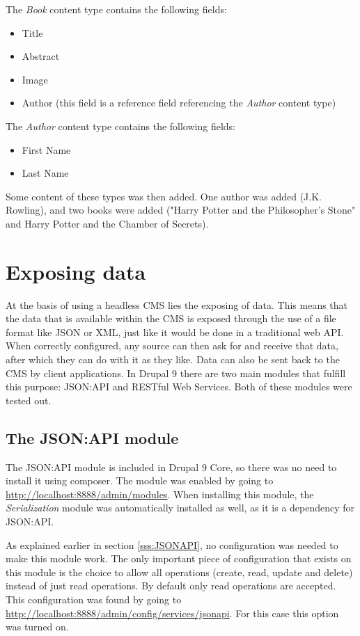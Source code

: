 The \emph{Book} content type contains the following fields: 

\begin{itemize}
	\item Title
	\item Abstract
	\item Image
	\item Author (this field is a reference field referencing the \emph{Author} content type)
\end{itemize}

The \emph{Author} content type contains the following fields:

\begin{itemize}
	\item First Name
	\item Last Name
\end{itemize}

Some content of these types was then added. One author was added (J.K. Rowling), and two books were added ("Harry Potter and the Philosopher's Stone" and Harry Potter and the Chamber of Secrets).

\section{Exposing data}

At the basis of using a headless CMS lies the exposing of data. This means that the data that is available within the CMS is exposed through the use of a file format like JSON or XML, just like it would be done in a traditional web API. When correctly configured, any source can then ask for and receive that data, after which they can do with it as they like. Data can also be sent back to the CMS by client applications. In Drupal 9 there are two main modules that fulfill this purpose: JSON:API and RESTful Web Services. Both of these modules were tested out.

\subsection{The JSON:API module}

The JSON:API module is included in Drupal 9 Core, so there was no need to install it using composer. The module was enabled by going to \url{http://localhost:8888/admin/modules}. When installing this module, the \emph{Serialization} module was automatically installed as well, as it is a dependency for JSON:API.

As explained earlier in section \ref{sss:JSONAPI}, no configuration was needed to make this module work. The only important piece of configuration that exists on this module is the choice to allow all operations (create, read, update and delete) instead of just read operations. By default only read operations are accepted. This configuration was found by going to \url{http://localhost:8888/admin/config/services/jsonapi}. For this case this option was turned on.

